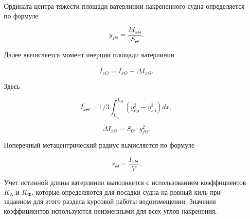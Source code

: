 Ордината центра тяжести площади ватерлинии накрененного судна определяется по формуле

\begin{equation}
    y_{f \Theta} = \frac{M_{x\Theta}}{S_{\Theta}}.
\end{equation}

Далее вычисляется момент инерции площади ватерлинии

\begin{equation}
    I_{x \Theta} = I_{x \Theta}^\prime - \Delta I_{x \Theta}.
\end{equation}

Здесь

\begin{equation}
    I_{x \Theta}^\prime = 1/3 \int_{L_{\text{К}}}^{L_{\text{Н}}} (y_{\text{пр}}^3 - y_{\text{лб}}^3) dx,
\end{equation}

\begin{equation}
    \Delta I_{x \Theta} = S_{\Theta} \cdot y_{f \Theta}^2.
\end{equation}

Поперечный метацентрический радиус вычисляется по формуле

\begin{equation}
    r_{\Theta} = \frac{I_{x \Theta}}{V}.
\end{equation}

Учет истинной длины ватерлинии выполняется с использованием коэффициентов $K_{\text{А}}$ и $K_{\text{Ф}}$, которые определяются для посадки судна на ровный киль при заданном для этого раздела курсовой работы водоизмещении.
Значения коэффициентов используются неизменными для всех углов накренения.

